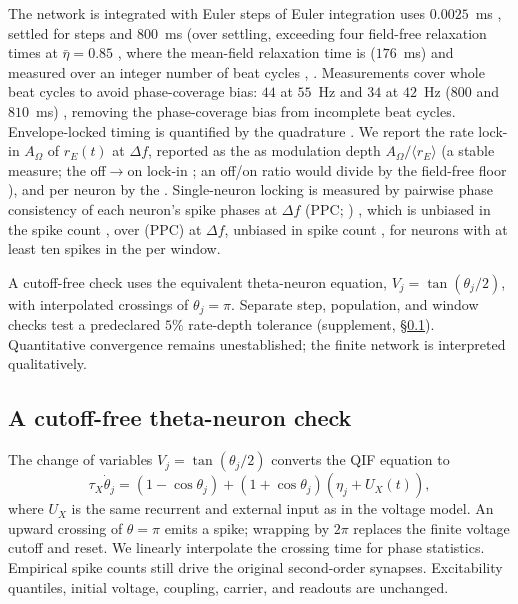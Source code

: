 \documentclass[11pt,a4paper]{article}
\newif\ifjne
\providecommand{\DIFaddtex}[1]{{\protect\color{blue} \sf #1}} %
\providecommand{\DIFdeltex}[1]{{\protect\color{red} \scriptsize #1}} %
\providecommand{\DIFaddbegin}{} %
\providecommand{\DIFaddend}{} %
\providecommand{\DIFdelbegin}{} %
\providecommand{\DIFdelend}{} %
\providecommand{\DIFadd}[1]{\texorpdfstring{\DIFaddtex{#1}}{#1}} %
\providecommand{\DIFdel}[1]{\texorpdfstring{\DIFdeltex{#1}}{}} %
\begin{document}
\DIFdelbegin \DIFdel{The network is integrated with Euler steps of }\DIFdelend \DIFaddbegin \DIFadd{Euler integration uses }\DIFaddend $0.0025$~ms \DIFdelbegin \DIFdel{, settled for }\DIFdelend \DIFaddbegin \DIFadd{steps and }\DIFaddend $800$~ms \DIFdelbegin \DIFdel{(over
}\DIFdelend \DIFaddbegin \DIFadd{settling, exceeding
}\DIFaddend four field-free relaxation times at $\bar\eta=0.85$ \DIFdelbegin \DIFdel{, where the mean-field relaxation time is
}\DIFdelend \DIFaddbegin \DIFadd{(}\DIFaddend $176$~ms)\DIFdelbegin \DIFdel{and measured over an integer number of beat cycles , }\DIFdelend \DIFaddbegin \DIFadd{.
Measurements cover whole beat cycles to avoid phase-coverage bias:
}\DIFaddend $44$ at $55$~Hz and $34$ at $42$~Hz ($800$ and $810$~ms)\DIFdelbegin \DIFdel{, removing the phase-coverage bias from incomplete
beat cycles.
Envelope-locked timing is quantified by the quadrature }\DIFdelend \DIFaddbegin \DIFadd{.
We report the rate }\DIFaddend lock-in \DIFdelbegin \DIFdel{$A_\Omega$ of
$r_E(t)$ at $\Delta f$, reported as the }\DIFdelend \DIFaddbegin \DIFadd{as }\DIFaddend modulation depth
$A_\Omega/\langle r_E\rangle$\DIFdelbegin \DIFdel{(a
stable measure; the off$\to$on lock-in }\DIFdelend \DIFaddbegin \DIFadd{; an off/on }\DIFaddend ratio would divide by the
field-free floor\DIFdelbegin \DIFdel{), and
per neuron by the }\DIFdelend \DIFaddbegin \DIFadd{. Single-neuron locking is measured by }\DIFaddend pairwise phase
consistency \DIFdelbegin \DIFdel{of each neuron's spike phases at $\Delta f$
(PPC; \cite{vinck2010}) , which is unbiased in the spike count
, over }\DIFdelend \DIFaddbegin \DIFadd{(PPC) at $\Delta f$, unbiased in spike count
\cite{vinck2010}, for }\DIFaddend neurons with at least ten spikes \DIFdelbegin \DIFdel{in the }\DIFdelend \DIFaddbegin \DIFadd{per }\DIFaddend window.

A cutoff-free check uses the equivalent theta-neuron equation,
$V_j=\tan(\theta_j/2)$, with interpolated crossings of $\theta_j=\pi$.
Separate step, population, and window checks test a predeclared $5\%$
rate-depth tolerance (supplement, \S\ref{supp:theta-pilot}). Quantitative
convergence remains unestablished; the finite network is interpreted qualitatively.
\ifjne\else
\subsection{A cutoff-free theta-neuron check}\label{supp:theta-pilot}
The change of variables $V_j=\tan(\theta_j/2)$ converts the QIF equation to
\[
\tau_X\dot\theta_j=(1-\cos\theta_j)
 +(1+\cos\theta_j)(\eta_j+U_X(t)),
\]
where $U_X$ is the same recurrent and external input as in the voltage model.
An upward crossing of $\theta=\pi$ emits a spike; wrapping by $2\pi$ replaces
the finite voltage cutoff and reset. We linearly interpolate the crossing
time for phase statistics. Empirical spike counts still drive the original
second-order synapses. Excitability quantiles, initial voltage, coupling,
carrier, and readouts are unchanged.
\end{document}
